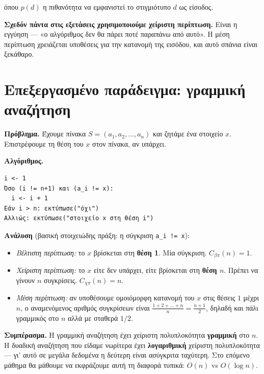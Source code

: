 \documentclass[11pt,a4paper]{article}
\begin{document}
όπου $p(d)$ η πιθανότητα να εμφανιστεί το στιγμιότυπο $d$ ως είσοδος.

\begin{warningbox}
\textbf{Σχεδόν πάντα στις εξετάσεις χρησιμοποιούμε χείριστη περίπτωση.} Είναι η
εγγύηση --- «ο αλγόριθμος δεν θα πάρει ποτέ παραπάνω από αυτό». Η μέση περίπτωση
χρειάζεται υποθέσεις για την κατανομή της εισόδου, και αυτό σπάνια είναι ξεκάθαρο.
\end{warningbox}

\section{Επεξεργασμένο παράδειγμα: γραμμική αναζήτηση}

\begin{examplebox}
\textbf{Πρόβλημα.} Έχουμε πίνακα $S = (a_1, a_2, \dots, a_n)$ και ζητάμε ένα
στοιχείο $x$. Επιστρέφουμε τη θέση του $x$ στον πίνακα, αν υπάρχει.

\textbf{Αλγόριθμος.}
\begin{codebox}
\begin{verbatim}
i <- 1
Όσο (i != n+1) και (a_i != x):
  i <- i + 1
Εάν i > n: εκτύπωσε("όχι")
Αλλιώς: εκτύπωσε("στοιχείο x στη θέση i")
\end{verbatim}
\end{codebox}

\textbf{Ανάλυση} (βασική στοιχειώδης πράξη: η σύγκριση \texttt{a\_i != x}):

\begin{itemize}
  \item \textit{Βέλτιστη περίπτωση:} το $x$ βρίσκεται στη \textbf{θέση 1}. Μία
  σύγκριση. $C_{\beta\pi}(n) = 1$.
  \item \textit{Χείριστη περίπτωση:} το $x$ είτε δεν υπάρχει, είτε βρίσκεται στη
  \textbf{θέση $n$}. Πρέπει να γίνουν $n$ συγκρίσεις. $C_{\chi\pi}(n) = n$.
  \item \textit{Μέση περίπτωση:} αν υποθέσουμε ομοιόμορφη κατανομή του $x$ στις
  θέσεις $1$ μέχρι $n$, ο αναμενόμενος αριθμός συγκρίσεων είναι
  $\frac{1 + 2 + \dots + n}{n} = \frac{n+1}{2}$, δηλαδή και πάλι γραμμικός στο $n$
  αλλά με σταθερά $1/2$.
\end{itemize}

\textbf{Συμπέρασμα.} Η γραμμική αναζήτηση έχει χείριστη πολυπλοκότητα
\textbf{γραμμική} στο $n$. Η δυαδική αναζήτηση που είδαμε νωρίτερα έχει
\textbf{λογαριθμική} χείριστη πολυπλοκότητα --- γι' αυτό σε μεγάλα δεδομένα η
δεύτερη είναι ασύγκριτα ταχύτερη. Στο επόμενο μάθημα θα μάθουμε να εκφράζουμε αυτή
τη διαφορά τυπικά: $O(n)$ vs $O(\log n)$.
\end{examplebox}
\end{document}
